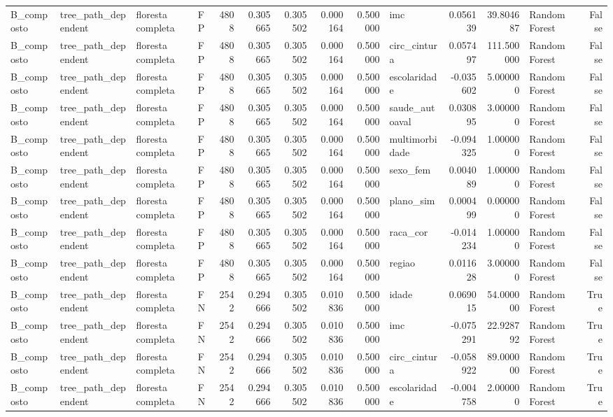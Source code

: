 \begin{tabular}{llllrrrrrlrrlr}
B_composto & tree_path_dependent & floresta completa & FP & 4808 & 0.305665 & 0.305502 & 0.000164 & 0.500000 & imc & 0.056139 & 39.804687 & Random Forest & False \\
B_composto & tree_path_dependent & floresta completa & FP & 4808 & 0.305665 & 0.305502 & 0.000164 & 0.500000 & circ_cintura & 0.057497 & 111.500000 & Random Forest & False \\
B_composto & tree_path_dependent & floresta completa & FP & 4808 & 0.305665 & 0.305502 & 0.000164 & 0.500000 & escolaridade & -0.035602 & 5.000000 & Random Forest & False \\
B_composto & tree_path_dependent & floresta completa & FP & 4808 & 0.305665 & 0.305502 & 0.000164 & 0.500000 & saude_autoaval & 0.030895 & 3.000000 & Random Forest & False \\
B_composto & tree_path_dependent & floresta completa & FP & 4808 & 0.305665 & 0.305502 & 0.000164 & 0.500000 & multimorbidade & -0.094325 & 1.000000 & Random Forest & False \\
B_composto & tree_path_dependent & floresta completa & FP & 4808 & 0.305665 & 0.305502 & 0.000164 & 0.500000 & sexo_fem & 0.004089 & 1.000000 & Random Forest & False \\
B_composto & tree_path_dependent & floresta completa & FP & 4808 & 0.305665 & 0.305502 & 0.000164 & 0.500000 & plano_sim & 0.000499 & 0.000000 & Random Forest & False \\
B_composto & tree_path_dependent & floresta completa & FP & 4808 & 0.305665 & 0.305502 & 0.000164 & 0.500000 & raca_cor & -0.014234 & 1.000000 & Random Forest & False \\
B_composto & tree_path_dependent & floresta completa & FP & 4808 & 0.305665 & 0.305502 & 0.000164 & 0.500000 & regiao & 0.011628 & 3.000000 & Random Forest & False \\
B_composto & tree_path_dependent & floresta completa & FN & 2542 & 0.294666 & 0.305502 & 0.010836 & 0.500000 & idade & 0.069015 & 54.000000 & Random Forest & True \\
B_composto & tree_path_dependent & floresta completa & FN & 2542 & 0.294666 & 0.305502 & 0.010836 & 0.500000 & imc & -0.075291 & 22.928792 & Random Forest & True \\
B_composto & tree_path_dependent & floresta completa & FN & 2542 & 0.294666 & 0.305502 & 0.010836 & 0.500000 & circ_cintura & -0.058922 & 89.000000 & Random Forest & True \\
B_composto & tree_path_dependent & floresta completa & FN & 2542 & 0.294666 & 0.305502 & 0.010836 & 0.500000 & escolaridade & -0.004758 & 2.000000 & Random Forest & True \\

\end{tabular}
